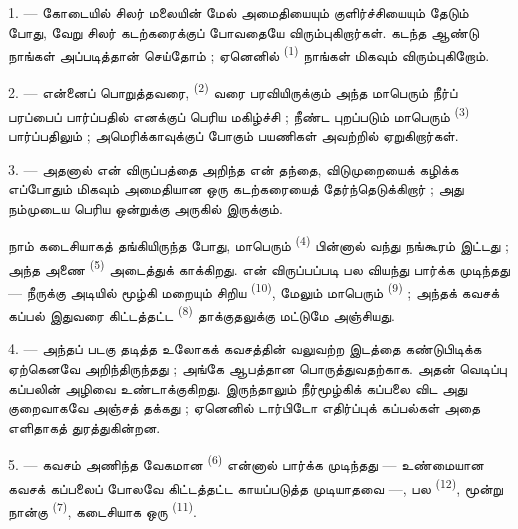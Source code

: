 \VUsaut{4.0mm}
\VUsaut{3.0mm}
\VUsaut{3.0mm}

1. --- கோடையில் சிலர் மலையின் மேல் அமைதியையும் குளிர்ச்சியையும்
தேடும் போது, வேறு சிலர் கடற்கரைக்குப் போவதையே விரும்புகிறார்கள்.
கடந்த ஆண்டு நாங்கள் அப்படித்தான் செய்தோம் ; ஏனெனில் 
\textsuperscript{(1)} நாங்கள் மிகவும் விரும்புகிறோம்.

2. --- என்னைப் பொறுத்தவரை,  \textsuperscript{(2)} வரை
பரவியிருக்கும் அந்த மாபெரும் நீர்ப் பரப்பைப் பார்ப்பதில் எனக்குப் பெரிய
மகிழ்ச்சி ; நீண்ட  புறப்படும் மாபெரும்
 \textsuperscript{(3)} பார்ப்பதிலும் ;
அமெரிக்காவுக்குப் போகும் பயணிகள் அவற்றில் ஏறுகிறார்கள்.

3. --- அதனால் என் விருப்பத்தை அறிந்த என் தந்தை, விடுமுறையைக் கழிக்க
எப்போதும் மிகவும் அமைதியான ஒரு கடற்கரையைத் தேர்ந்தெடுக்கிறார் ; அது
நம்முடைய பெரிய  ஒன்றுக்கு அருகில்
இருக்கும்.

நாம் கடைசியாகத் தங்கியிருந்த போது, 
மாபெரும்  \textsuperscript{(4)} பின்னால் வந்து
நங்கூரம் இட்டது ; அந்த அணை 
\textsuperscript{(5)} அடைத்துக் காக்கிறது. என் விருப்பப்படி பல 
வியந்து பார்க்க முடிந்தது — நீருக்கு அடியில் மூழ்கி மறையும் சிறிய
 \textsuperscript{(10)}, மேலும் மாபெரும்
 \textsuperscript{(9)} ; அந்தக் கவசக் கப்பல்
இதுவரை கிட்டத்தட்ட  \textsuperscript{(8)}
தாக்குதலுக்கு மட்டுமே அஞ்சியது.

\VUsaut{3.0mm}
\VUsaut{3.0mm}

4. --- அந்தப் படகு தடித்த உலோகக் கவசத்தின் வலுவற்ற இடத்தை
 கண்டுபிடிக்க ஏற்கெனவே அறிந்திருந்தது ; அங்கே
ஆபத்தான  பொருத்துவதற்காக. அதன் வெடிப்பு
கப்பலின் அழிவை உண்டாக்குகிறது. இருந்தாலும் நீர்மூழ்கிக் கப்பலை விட
அது குறைவாகவே அஞ்சத் தக்கது ; ஏனெனில் டார்பிடோ எதிர்ப்புக்
கப்பல்கள் அதை எளிதாகத் துரத்துகின்றன.

5. --- கவசம் அணிந்த வேகமான 
\textsuperscript{(6)} என்னால் பார்க்க முடிந்தது — உண்மையான கவசக்
கப்பலைப் போலவே கிட்டத்தட்ட காயப்படுத்த முடியாதவை —, பல
 \textsuperscript{(12)},
மூன்று நான்கு  \textsuperscript{(7)},
கடைசியாக ஒரு  \textsuperscript{(11)}.

